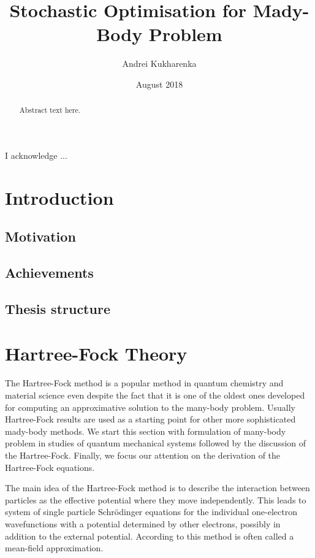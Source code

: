 \documentclass[twoside,english]{uiofysmaster}
\author{Andrei Kukharenka}
\title{Stochastic Optimisation for Mady-Body Problem}
\date{August 2018}
\begin{document}
	
	\maketitle
	
	\begin{abstract}
		Abstract text here.
	\end{abstract}
	
	
	\begin{acknowledgements}
		I acknowledge ...
	\end{acknowledgements}
	
	\tableofcontents
	
\chapter{Introduction}
	
\section{Motivation }
\section{Achievements }
\section{Thesis structure}




\chapter{Hartree-Fock Theory}\label{Ch:HF}


The Hartree-Fock method is a popular method in quantum chemistry and material science even despite the fact that it is one of the oldest ones developed for computing an approximative solution to the many-body problem. Usually Hartree-Fock results are used as a starting point for other more sophisticated mady-body methods.
We start this section with formulation of many-body problem in studies of quantum mechanical systems followed by the discussion of the Hartree-Fock. Finally, we focus our attention on the derivation of the Hartree-Fock equations.

The main idea of the Hartree-Fock method is to describe the interaction between particles as the effective potential where they move independently. This leads to system of single particle Schr\"{o}dinger equations for the individual one-electron wavefunctions with a potential determined by other electrons, possibly in addition to the external potential. According to this method is often called a mean-field approximation.  \\
 
\end{document}
